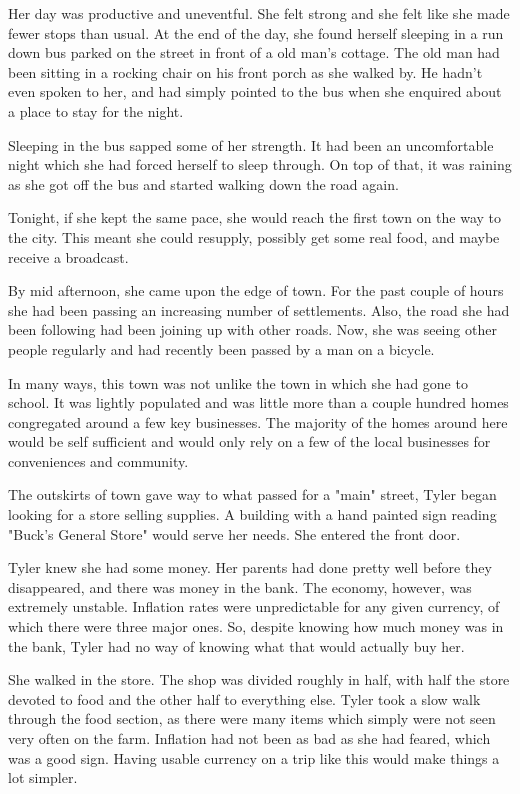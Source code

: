 \documentclass[courier]{sffms}
\begin{document}
Her day was productive and uneventful. She felt strong
and she felt like she made fewer stops than usual. At the
end of the day, she found herself sleeping in a run down
bus parked on the street in front of a old man's cottage.
The old man had been sitting in a rocking chair on his
front porch as she walked by. He hadn't even spoken to
her, and had simply pointed to the bus when she
enquired about a place to stay for the night.

Sleeping in the bus sapped some of her strength. It had
been an uncomfortable night which she had forced
herself to sleep through. On top of that, it was raining as
she got off the bus and started walking down the road
again.

Tonight, if she kept the same pace, she would reach the
first town on the way to the city. This meant she could
resupply, possibly get some real food, and maybe 
receive a broadcast.

By mid afternoon, she came upon the edge of town.
For the past couple of hours she had been passing an
increasing number of settlements. Also, the road
she had been following had been joining up with other
roads. Now, she was seeing other people regularly and
had recently been passed by a man on a bicycle.

In many ways, this town was not unlike the town in
which she had gone to school. It was lightly populated
and was little more than a couple hundred homes
congregated around a few key businesses. The majority
of the homes around here would be self sufficient and
would only rely on a few of the local businesses for
conveniences and community.

The outskirts of town gave way to what passed for a
"main" street, Tyler began looking for a store selling
supplies. A building with a hand painted sign reading
"Buck's General Store" would serve her needs. She entered
the front door.

Tyler knew she had some money. Her parents had done
pretty well before they disappeared, and there was
money in the bank. The economy, however, was extremely
unstable. Inflation rates were unpredictable for any given
currency, of which there were three major ones. So,
despite knowing how much money was in the bank, Tyler
had no way of knowing what that would actually buy her.

She walked in the store. The shop was divided roughly in
half, with half the store devoted to food and the other
half to everything else. Tyler took a slow walk through the
food section, as there were many items which simply were
not seen very often on the farm. Inflation had not been
as bad as she had feared, which was a good sign. Having
usable currency on a trip like this would make things a lot
simpler.
\end{document}
